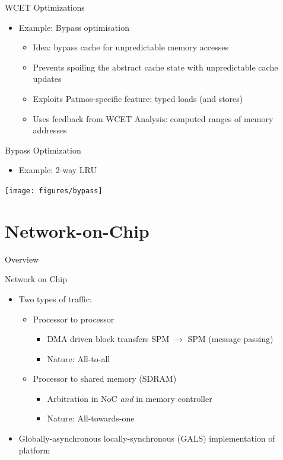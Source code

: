 \documentclass[17pt]{beamer}
\begin{document}
\begin{frame}{WCET Optimizations}
  \begin{itemize}
  \item Example: Bypass optimisation
    \begin{itemize}
    \item Idea: bypass cache for unpredictable memory accesses
    \item Prevents spoiling the abstract cache state with
      unpredictable cache updates
    \item Exploits Patmos-specific feature: typed loads (and stores)
    \item Uses feedback from WCET Analysis: computed ranges of memory
      addresses
    \end{itemize}
  \end{itemize}
\end{frame}

\begin{frame}{Bypass Optimization}
  \begin{itemize}
  \item Example: 2-way LRU
  \end{itemize}
  \begin{center}
  \texttt{[image: figures/bypass]}    
  \end{center}
\end{frame}

\section{Network-on-Chip}

\begin{frame}{Overview}
  \tableofcontents[currentsection]
\end{frame}

\begin{frame}{Network on Chip}
  \begin{itemize}
  \item Two types of traffic:
    \begin{itemize}
    \item Processor to processor
      \begin{itemize}
      \item DMA driven block transfers SPM $\rightarrow$ SPM (message passing)
      \item Nature: All-to-all
      \end{itemize}
    \item Processor to shared memory (SDRAM)
      \begin{itemize}
      \item Arbitration in NoC \emph{and} in memory controller
      \item Nature: All-towards-one
      \end{itemize}
    \end{itemize}
  \item Globally-asynchronous locally-synchronous (GALS)
    implementation of platform
  \end{itemize}  
\end{frame}
\end{document}
